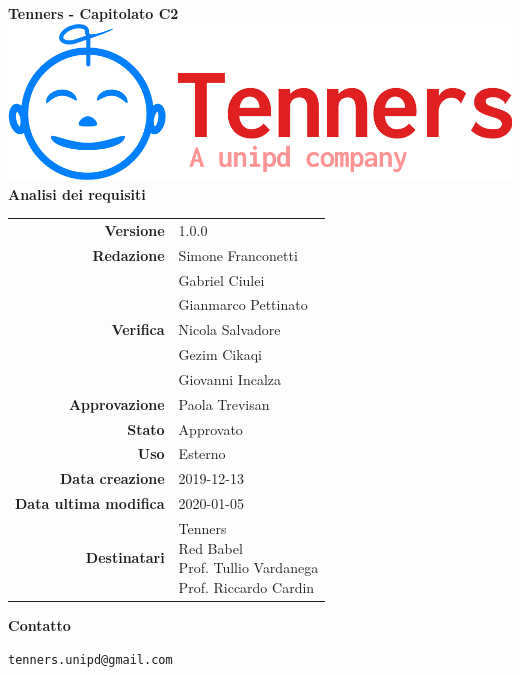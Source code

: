 \begin{titlepage}
	\begin{center}
		\large \textbf{Tenners - Capitolato C2}
		\vfill
		\includegraphics[scale = 0.3]{./res/img/logo.png}\\
		\vfill
		\Huge \textbf{Analisi dei requisiti}

        \vfill
        \large

        \begin{tabular}{r|l}
                        \textbf{Versione} & 1.0.0 \\
                        \textbf{Redazione} &
                        Simone Franconetti\\&
                        Gabriel Ciulei \\&
												Gianmarco Pettinato \\
                        \textbf{Verifica} &
                        Nicola Salvadore \\&
												Gezim Cikaqi \\&
                        Giovanni Incalza \\
                        \textbf{Approvazione} & Paola Trevisan \\
                        \textbf{Stato} & Approvato \\
                        \textbf{Uso} & Esterno\\
                        \textbf{Data creazione} & 2019-12-13\\
                        \textbf{Data ultima modifica} & 2020-01-05\\
                        \textbf{Destinatari} & \parbox[t]{5cm}{Tenners\\Red Babel\\Prof. Tullio Vardanega\\Prof. Riccardo Cardin}
                \end{tabular}
                \vfill
                \normalsize
                \vfill
                \textbf{Contatto}

                \texttt{tenners.unipd@gmail.com}

	\end{center}
\end{titlepage}
